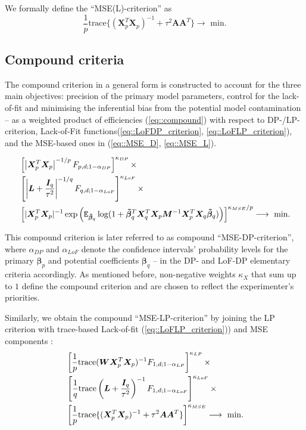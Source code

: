 We formally define the ``MSE(L)-criterion'' as
\begin{equation}
\label{eq::MSE_L}
\frac{1}{p}\mbox{trace}\{(\bm{X}^T_{p}\bm{X}_{p})^{-1}+\tau^2\bm{A}\bm{A}^T\} \longrightarrow \mbox{ min.}
\end{equation}
 
\subsection*{Compound criteria}
The compound criterion in a general form is constructed to account for the three main objectives: precision of the primary model parameters, control for the lack-of-fit and minimising the inferential bias from the potential model contamination -- as a weighted product of efficiencies (\ref{eq::compound}) with respect to DP-/LP-criterion, Lack-of-Fit functions(\ref{eq::LoFDP_criterion}, \ref{eq::LoFLP_criterion}), and the MSE-based ones in (\ref{eq::MSE_D}, \ref{eq::MSE_L}). 

\begin{align}
\label{eq::MSE_DP}
&\left[\left|\bm{X}^T_{p}\bm{X}_{p}\right|^{-1/p}F_{p,d;1-\alpha_{DP}}\right]^{\kappa_{DP}} \times \notag \\ &\left[\left|\bm{L}+\frac{\bm{I}_{q}}{\tau^{2}}\right|^{-1/q}F_{q,d;1-\alpha_{LoF}}\right]^{\kappa_{LoF}}\times \notag\\ & \left[|\bm{X}^T_{p}\bm{X}_{p}|^{-1}\exp\left(\mathtt{E}_{\bm{\tilde{\beta}}_q}\log(1+\bm{\tilde{\beta}}_q^T\bm{X}_q^{T}\bm{X}_p\bm{M}^{-1}\bm{X}_p^{T}\bm{X}_q\bm{\tilde{\beta}}_q) \right)\right]^{\kappa_{MSE}/p} \longrightarrow \mbox{ min.}
\end{align}
 
This compound criterion is later referred to as compound ``MSE-DP-criterion'', where $\alpha_{DP}$ and $\alpha_{LoF}$ denote the confidence intervals' probability levels for the primary $\bm{\beta}_p$ and potential coefficients $\bm{\beta}_q$ -- in the DP- and LoF-DP elementary criteria accordingly. As mentioned before, non-negative weights $\kappa_X$ that sum up to $1$ define the compound criterion and are chosen to reflect the experimenter's priorities. 

Similarly, we obtain the compound ``MSE-LP-criterion'' by joining the LP criterion with trace-based Lack-of-fit (\ref{eq::LoFLP_criterion})) and MSE components :
\begin{align}
\label{eq::MSE_LP} &\left[\frac{1}{p}\mbox{trace}(\bm{WX}^T_{p}\bm{X}_{p})^{-1}F_{1,d;1-\alpha_{LP}}\right]^{\kappa_{LP}}\times \notag\\& \left[\frac{1}{q}\mbox{trace}\left(\bm{L}+\frac{\bm{I}_{q}}{\tau^{2}}\right)^{-1}F_{1,d;1-\alpha_{LoF}}\right]^{\kappa_{LoF}}\times 
\notag\\& \left[\frac{1}{p}\mbox{trace}\{(\bm{X}^T_{p}\bm{X}_{p})^{-1}+\tau^2\bm{A}\bm{A}^T\}\right]^{\kappa_{MSE}} \longrightarrow \mbox{ min.}
\end{align}

